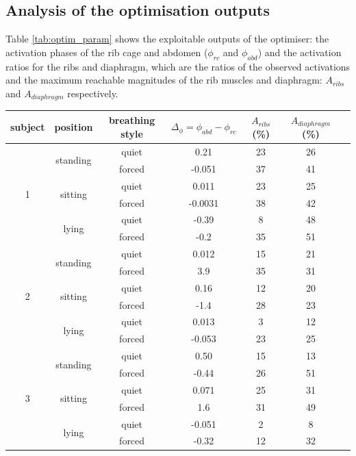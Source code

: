 \subsection{Analysis of the optimisation outputs}
Table \ref{tab:optim_param} shows the exploitable outputs of the optimiser: the activation phases of the rib cage and abdomen ($\phi_{rc}$ and $\phi_{abd}$) and the activation ratios for the ribs and diaphragm, which are the ratios of the observed activations and the maximum reachable magnitudes of the rib muscles and diaphragm: $A_{ribs}$ and $A_{diaphragm}$ respectively.

\begin{table}
\begin{center}
\begin{tabular}{|c|c|c|c|c|c|c|}
\hline
 subject & position & breathing style & $\Delta_{\phi} = \phi_{abd} - \phi_{rc}$ & $A_{ribs}$ (\%) & $A_{diaphragm}$ (\%)\\ 
\hline
\hline

 \multirow{6}{*}{1} & \multirow{2}{*}{standing} & quiet & 0.21 & 23 & 26 \\ 
 & & forced & -0.051 & 37 & 41 \\ \cline{2-6}
 & \multirow{2}{*}{sitting} & quiet & 0.011 & 23 & 25 \\ 
 & & forced & -0.0031 & 38 & 42 \\ \cline{2-6}
 & \multirow{2}{*}{lying} & quiet & -0.39 & 8 & 48 \\ 
 & & forced & -0.2 & 35 & 51 \\ \hline \hline
 
 \multirow{6}{*}{2} & \multirow{2}{*}{standing} & quiet & 0.012 & 15 & 21 \\ 
 & & forced & 3.9 & 35 & 31 \\ \cline{2-6}
 & \multirow{2}{*}{sitting} & quiet & 0.16 & 12 & 20 \\ 
 & & forced & -1.4 & 28 & 23 \\ \cline{2-6}
 & \multirow{2}{*}{lying} & quiet & 0.013 & 3 & 12 \\ 
 & & forced & -0.053 & 23 & 25 \\ \hline \hline
 
 \multirow{6}{*}{3} & \multirow{2}{*}{standing} & quiet & 0.50 & 15 & 13  \\ 
 & & forced & -0.44 & 26 & 51 \\ \cline{2-6}
 & \multirow{2}{*}{sitting} & quiet & 0.071 & 25 & 31 \\ 
 & & forced & 1.6 & 31 & 49 \\ \cline{2-6}
 & \multirow{2}{*}{lying} & quiet & -0.051 & 2 & 8 \\ 
 & & forced & -0.32 & 12 & 32 \\
  

\end{tabular}
\end{center}
\end{table}
